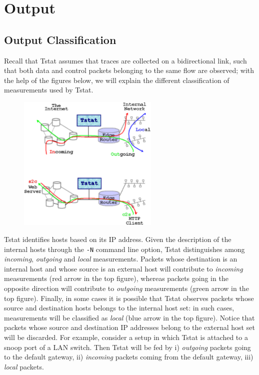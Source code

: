 \documentclass[11pt]{article}
\begin{document}
\section{Output\label{Output}}
\subsection{Output Classification\label{Output_Classification}}


Recall that Tstat assumes that traces are collected on a bidirectional link,
such that both data and control packets belonging to the same flow are observed;
with the help of the figures below, we will explain the different classification
of measurements used by Tstat.



         \begin{figure}[!htb]
             \begin{center}
                 \includegraphics[width=0.6\textwidth]{tstat_output.eps}
             \end{center}
         \end{figure}





Tstat identifies hosts based on its IP address. Given the description
of the internal hosts through the \texttt{-N} command line option, Tstat
distinguishes among \textit{incoming}, \textit{outgoing} and \textit{local} 
measurements. Packets whose destination is an internal host and whose source is
an external host will contribute to \textit{incoming} measurements (red arrow in the
top figure), whereas packets going
in the opposite direction will contribute to \textit{outgoing} measurements (green
arrow in the top figure). Finally, in
some cases it is possible that Tstat observes packets whose source and
destination hosts belongs to the internal host set: in such cases, measurements
will be classified as \textit{local} (blue arrow in the top figure).
Notice that packets whose source and destination IP
addresses belong to the external host set will be discarded.
For example, consider a setup in which Tstat is attached to a snoop port of a
LAN switch. Then Tstat will be fed by i) \textit{outgoing} packets going to the default gateway,
ii) \textit{incoming}   packets coming from the default gateway,
iii) \textit{local} packets.
\end{document}

